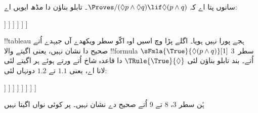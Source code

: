 \documentclass[../../../include/open-logic-section]{subfiles}
\begin{document}
{
\begin{ex}
  سانوں پتا اے کہ $\Proves/ (\Diamond p \land \Diamond q) \lif \Diamond(p
  \land q)$۔ تابلو بناؤن دا مڈھ ایویں اے:
  \begin{oltableau}
    [\pFmla{\False}{(\Diamond p \land \Diamond q) \lif \Diamond(p \land q)}{1},
      just = \TAss, checked
      [\pFmla{\True}{\Diamond p \land \Diamond q}{1},
        just = {\TRule{\False}{\lif}[1]}, checked
        [\pFmla{\False}{\Diamond(p \land q)}{1},
          just = {\TRule{\False}{\lif}[1]}
          [\pFmla{\True}{\Diamond p}{1},
            just = {\TRule{\True}{\land}[2]}, checked
            [\pFmla{\True}{\Diamond q}{1},
              just = {\TRule{\True}{\land}[2]}, checked
              [\pFmla{\True}{p}{1.1}, 
                just = {\TRule{\True}{\Diamond}[4]}, checked
                [\pFmla{\True}{q}{1.2}, 
                  just = {\TRule{\True}{\Diamond}[5]}, checked
                ]
              ]
            ]
          ]
        ]
      ]
    ]
  \end{oltableau}
  !!{tableau} ہجے پورا نہیں ہویا۔ اگلے پڑا وچ اسیں اوہ اکّو سطر ویکھدے
  آں جیہدے اُتے صحیح دا نشان نہیں، یعنی اگیتے والا !!{formula}
  $\sFmla{\True}{\Diamond(p \land q)}[1]$ سطر~$3$ اُتے۔ بند تابلو بناؤن لئی
  $\TRule{\True}{\Diamond}$ دا قاعدہ شاخ اُتے ورتے ہوئے ہر اگیتے لئی لانا
  اے، یعنی $1.1$ تے $1.2$ دونہاں لئی:
  \begin{oltableau}
    [\pFmla{\False}{\Diamond(p \land q) \lif (\Diamond p \land \Diamond q)}{1},
      just = \TAss, checked
      [\pFmla{\True}{\Diamond p \land \Diamond q}{1},
        just = {\TRule{\False}{\lif}[1]}, checked
        [\pFmla{\False}{\Diamond (p \land q)}{1},
          just = {\TRule{\False}{\lif}[1]}
          [\pFmla{\True}{\Diamond p}{1},
            just = {\TRule{\True}{\land}[2]}, checked
            [\pFmla{\True}{\Diamond q}{1},
              just = {\TRule{\True}{\land}[2]}, checked
              [\pFmla{\True}{p}{1.1}, 
                just = {\TRule{\True}{\Diamond}[4]}, checked
                [\pFmla{\True}{q}{1.2}, 
                  just = {\TRule{\True}{\Diamond}[5]}, checked
                  [\pFmla{\False}{p \land q}{1.1}, 
                    just = {\TRule{\False}{\Diamond}[3]}
                    [\pFmla{\False}{p \land q}{1.2}, 
                      just = {\TRule{\False}{\Diamond}[3]}
                    ]
                  ]
                ]
              ]
            ]
          ]
        ]
      ]
    ]
  \end{oltableau}
  ہُن سطر 3، 8 تے 9 اُتے صحیح دے نشان نہیں۔ پر کوئی نواں اگیتا نہیں

\end{ex}}
\end{document}
